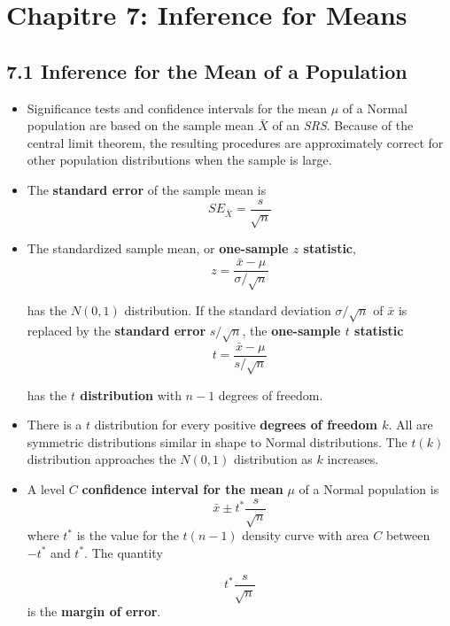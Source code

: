 \section{Chapitre 7: Inference for Means}
	\subsection{7.1 Inference for the Mean of a Population}
		\begin{itemize}
			\item Significance tests and confidence intervals for the mean $\mu$ of a Normal population are based on the sample mean $\bar{X}$ of an \textit{SRS}. Because of the central limit theorem, the resulting procedures are approximately correct for other population distributions when the sample is large.
			
			\item The \textbf{standard error} of the sample mean is \[SE_{\bar{X}}=\frac{s}{\sqrt{n}}\]			
			
			\item The standardized sample mean, or \textbf{one-sample $z$ statistic},\[z=\frac{\bar{x}-\mu}{\sigma/\sqrt{n}}\]
			
			has the $N(0, 1)$ distribution. If the standard deviation $\sigma/\sqrt{n}$ of $\bar{x}$ is replaced by the \textbf{standard error} $s/\sqrt{n}$, the \textbf{one-sample $t$ statistic}
			\[t=\frac{\bar{x}-\mu}{s/\sqrt{n}}\]
			
			has the \textbf{$t$ distribution} with $n-1$ degrees of freedom.
			
			\item There is a $t$ distribution for every positive \textbf{degrees of freedom $k$}. All are symmetric distributions similar in shape to Normal distributions. The $t(k)$ distribution approaches the $N(0, 1)$ distribution as $k$ increases.
			
			\item A level $C$ \textbf{confidence interval for the mean} $\mu$ of a Normal population is
			\[\bar{x}\pm t^{*}\frac{s}{\sqrt{n}}\]			
			where $t^{*}$ is the value for the $t(n - 1)$ density curve with area $C$ between $-t^{*}$ and $t^{*}$. The quantity
			
			\[t^{*}\frac{s}{\sqrt{n}}\]			
			is the \textbf{margin of error}.
			

\end{itemize}
